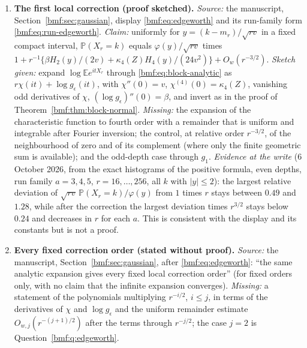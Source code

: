 \documentclass[11pt]{article}
\numberwithin{equation}{section}
\theoremstyle{definition}
\theoremstyle{remark}
\newcommand{\E}{\mathbb E}
\newcommand{\Prob}{\mathbb P}
\newcommand{\ph}{\varphi}
\begin{document}
\begin{enumerate}[leftmargin=*,itemsep=7pt]
\item \label{bmf:q:edgeworth}\textbf{The first local correction
(proof sketched).} \emph{Source:} the manuscript,
Section~\ref{bmf:sec:gaussian}, display \eqref{bmf:eq:edgeworth} and its
run-family form \eqref{bmf:eq:run-edgeworth}. \emph{Claim:} uniformly for
$y=(k-m_r)/\sqrt{rv}$ in a fixed compact interval, $\Prob(X_r=k)$ equals
$\ph(y)/\sqrt{rv}$ times
$1+r^{-1}\{\beta H_2(y)/(2v)+\kappa_4(Z)H_4(y)/(24v^2)\}+O_w(r^{-3/2})$.
\emph{Sketch given:} expand $\log\E e^{itX_r}$ through
\eqref{bmf:eq:block-analytic} as $r\chi(it)+\log g_\epsilon(it)$, with
$\chi''(0)=v$, $\chi^{(4)}(0)=\kappa_4(Z)$, vanishing odd derivatives of
$\chi$, $(\log g_\epsilon)''(0)=\beta$, and invert as in the proof of
Theorem~\ref{bmf:thm:block-normal}. \emph{Missing:} the expansion of the
characteristic function to fourth order with a remainder that is uniform
and integrable after Fourier inversion; the control, at relative order
$r^{-3/2}$, of the neighbourhood of zero and of its complement (where only
the finite geometric sum is available); and the odd-depth case through
$g_1$. \emph{Evidence at the write} (6 October 2026, from the exact
histograms of the positive formula, even depths, run family $a=3,4,5$,
$r=16,\dots,256$, all $k$ with $|y|\le2$): the largest relative deviation
of $\sqrt{rv}\,\Prob(X_r=k)/\ph(y)$ from $1$ times $r$ stays between
$0.49$ and $1.28$, while after the correction the largest deviation times
$r^{3/2}$ stays below $0.24$ and decreases in $r$ for each $a$. This is
consistent with the display and its constants but is not a proof.

\item \label{bmf:q:fixed-orders}\textbf{Every fixed correction order
(stated without proof).} \emph{Source:} the manuscript,
Section~\ref{bmf:sec:gaussian}, after \eqref{bmf:eq:edgeworth}: ``the same
analytic expansion gives every fixed local correction order'' (for fixed
orders only, with no claim that the infinite expansion converges).
\emph{Missing:} a statement of the polynomials multiplying $r^{-i/2}$,
$i\le j$, in terms of the derivatives of $\chi$ and $\log g_\epsilon$
and the uniform remainder
estimate $O_{w,j}(r^{-(j+1)/2})$ after the terms through $r^{-j/2}$; the
case $j=2$ is Question~\ref{bmf:q:edgeworth}.
\end{enumerate}
\end{document}
